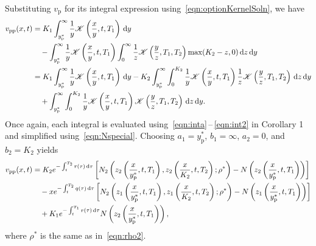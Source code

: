Substituting $v_\mathrm{p}$ for its integral expression using~\eqref{eqn:optionKernelSoln}, we have
	\begin{align*}
		v_\text{pp}(x,t) &= K_1\int_{y_\mathrm{p}^*}^\infty \frac{1}{y}\mathscr K\left( \frac{x}{y}, t, T_1 \right) \, \mathrm d y \\
		&\quad - \int_{y_\mathrm{p}^*}^\infty \frac{1}{y}\mathscr K\left( \frac{x}{y}, t, T_1 \right)\int_0^\infty \frac{1}{z} \mathscr K\left( \frac{y}{z}, T_1, T_2 \right)\max(K_2-z, 0) \, \mathrm d z \, \mathrm d y 		\\
		&=  K_1\int_{y_\mathrm{p}^*}^\infty \frac{1}{y}\mathscr K\left( \frac{x}{y}, t, T_1 \right) \, \mathrm d y - K_2 \int_{y_\mathrm{p}^*}^\infty \int_{0}^{K_2} \frac{1}{y}\mathscr K\left( \frac{x}{y}, t, T_1 \right)\frac{1}{z}\mathscr K\left( \frac{y}{z}, T_1, T_2 \right) \, \mathrm d z \, \mathrm d y \\
		&\quad +  \int_{y_\mathrm{p}^*}^\infty \int_{0}^{K_2} \frac{1}{y}\mathscr K\left( \frac{x}{y}, t, T_1 \right)\mathscr K\left( \frac{y}{z}, T_1, T_2 \right) \, \mathrm d z \, \mathrm d y.
	\end{align*}
Once again, each integral is evaluated using~\eqref{eqn:inta}\,--\,\eqref{eqn:int2} in Corollary 1 and simplified using~\eqref{eqn:Nspecial}. Choosing $a_1 = y_\mathrm{p}^*$, $b_1 = \infty$, $a_2 = 0$, and $b_2 = K_2$ yields
	\begin{align}
		v_\text{pp}(x,t) &=  K_2e^{-\int_t^{T_2} r(\tau) \, \d\tau}\left[ N_2\left( z_2\left( \fr{x}{y_\mathrm{p}^*}, t, T_1 \right), z_2\left( \fr{x}{K_2}, t, T_2 \right); \rho^* \right) - N\left(z_2\left( \fr{x}{y_\text{p}^*},t, T_1 \right)\right)\right] \nonumber \\ %
		&\quad - xe^{-\int_t^{T_2} q(\tau) \, \d\tau}\left[ N_2\left( z_1\left( \fr{x}{y_\text{p}^*}, t, T_1 \right), z_1\left( \fr{x}{K_2}, t, T_2 \right); \rho^* \right) - N\left(z_1\left( \fr{x}{y_\text{p}^*},t, T_1 \right)\right)\right] \nonumber \\
		&\quad + K_1e^{-\int_t^{T_1} r(\tau) \,\d\tau}N\left( z_2\left( \fr{x}{y_\text{p}^*}, t, T_1 \right) \right), \nonumber
	\end{align}
where $\rho^*$ is the same as in~\eqref{eqn:rho2}.

